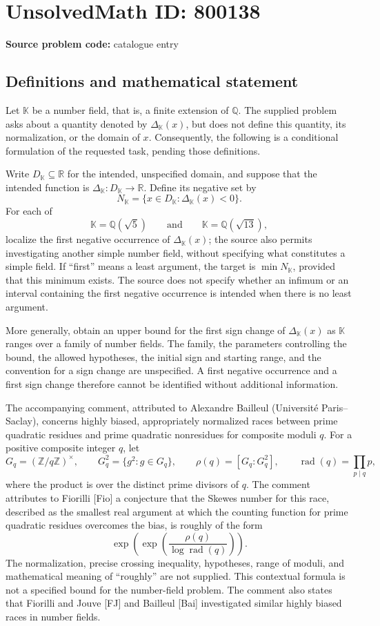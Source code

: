 \documentclass[11pt]{article}
\newcommand{\Z}{\mathbb{Z}}
\newcommand{\Q}{\mathbb{Q}}
\newcommand{\R}{\mathbb{R}}
\begin{document}
\section*{UnsolvedMath ID: 800138}
\textbf{Source problem code:} catalogue entry
\subsection{Definitions and mathematical statement}
Let \(\mathbb K\) be a number field, that is, a finite extension of \(\Q\). The supplied problem asks about a quantity denoted by \(\Delta_{\mathbb K}(x)\), but does not define this quantity, its normalization, or the domain of \(x\). Consequently, the following is a conditional formulation of the requested task, pending those definitions.

Write \(D_{\mathbb K}\subseteq\R\) for the intended, unspecified domain, and suppose that the intended function is \(\Delta_{\mathbb K}:D_{\mathbb K}\to\R\). Define its negative set by
\[
N_{\mathbb K}=\{x\in D_{\mathbb K}:\Delta_{\mathbb K}(x)<0\}.
\]
For each of
\[
\mathbb K=\Q(\sqrt{5})\qquad\text{and}\qquad\mathbb K=\Q(\sqrt{13}),
\]
localize the first negative occurrence of \(\Delta_{\mathbb K}(x)\); the source also permits investigating another simple number field, without specifying what constitutes a simple field. If ``first'' means a least argument, the target is \(\min N_{\mathbb K}\), provided that this minimum exists. The source does not specify whether an infimum or an interval containing the first negative occurrence is intended when there is no least argument.

More generally, obtain an upper bound for the first sign change of \(\Delta_{\mathbb K}(x)\) as \(\mathbb K\) ranges over a family of number fields. The family, the parameters controlling the bound, the allowed hypotheses, the initial sign and starting range, and the convention for a sign change are unspecified. A first negative occurrence and a first sign change therefore cannot be identified without additional information.

The accompanying comment, attributed to Alexandre Bailleul (Universit\'e Paris--Saclay), concerns highly biased, appropriately normalized races between prime quadratic residues and prime quadratic nonresidues for composite moduli \(q\). For a positive composite integer \(q\), let
\[
G_q=(\Z/q\Z)^\times,\qquad
G_q^2=\{g^2:g\in G_q\},\qquad
\rho(q)=[G_q:G_q^2],\qquad
\operatorname{rad}(q)=\prod_{p\mid q}p,
\]
where the product is over the distinct prime divisors of \(q\). The comment attributes to Fiorilli [Fio] a conjecture that the Skewes number for this race, described as the smallest real argument at which the counting function for prime quadratic residues overcomes the bias, is roughly of the form
\[
\exp\!\left(\exp\!\left(\frac{\rho(q)}{\log\operatorname{rad}(q)}\right)\right).
\]
The normalization, precise crossing inequality, hypotheses, range of moduli, and mathematical meaning of ``roughly'' are not supplied. This contextual formula is not a specified bound for the number-field problem. The comment also states that Fiorilli and Jouve [FJ] and Bailleul [Bai] investigated similar highly biased races in number fields.
\end{document}
